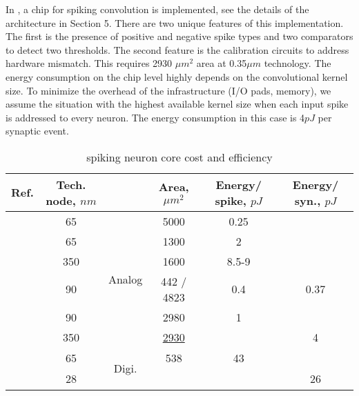 \documentclass[conference, compsoc]{IEEEtran}
\begin{document}
In \cite{DVS_analog,CAVIAR}, a chip for spiking convolution is implemented, see the details of the architecture in Section 5. There are two unique features of this implementation. The first is the presence of positive and negative spike types and two comparators to detect two thresholds. The second feature is the calibration circuits to address hardware mismatch. This requires 2930 $ \mu m^{2} $ area at 0.35$ \mu m $ technology. The energy consumption on the chip level highly depends on the convolutional kernel size. To minimize the overhead of the infrastructure (I/O pads, memory), we assume the situation with the highest available kernel size when each input spike is addressed to every neuron. The energy consumption in this case is 4$ pJ $ per synaptic event.
\begin{table}[h]
	\caption{spiking neuron core cost and efficiency}
	\label{table:2}
	\centering
	\setlength{\tabcolsep}{5pt}
	\begin{tabular} {|c|c|c|c|c|c|}
		\hline Ref. &  \pbox[t]{40pt}{Tech. node,\\ $ nm $} & & Area, $ \mu m^{2} $  & \pbox[t]{35pt}{Energy/\\spike, $ pJ $} & \pbox[t]{30pt}{Energy/\\syn., $ pJ $}\\ 
		\hline \cite{Phong} & 65 & \multirow{6}{*}{\begin{turn}{90}Analog\end{turn}} & 5000 & 0.25 & \\
		\cline{1-2}\cline{4-6} \cite{HardwareOrAnalog} & 65 &  & 1300 & 2 & \\
		\cline{1-2}\cline{4-6} \cite{Wijekoon_compact_silicon_circuit} & 350 &  & 1600 & 8.5-9 & \\
		\cline{1-2}\cline{4-6} \cite{Energy-Efficient-Neuron} & 90 &  & 442 / 4823 & 0.4 & 0.37 \\
		\cline{1-2}\cline{4-6} \cite{Subthreshold_Izhikevich} & 90 &  & 2980 & 1 &  \\
		\cline{1-2}\cline{4-6} \cite{CAVIAR}\cite{DVS_analog} & 350 &  & \underline{2930} & & 4 \\
		\hline \cite{HardwareOrAnalog} & 65 & \multirow{2}{*}{\begin{turn}{90}Digi.\end{turn}} & 538 & 43 & \\	[0.25pt]
		\cline{1-2}\cline{4-6} \cite{TrueNorth} & 28 &  &  &  & 26 \\	[0.25pt]
		\hline
	\end{tabular} 
\end{table}
\end{document}

